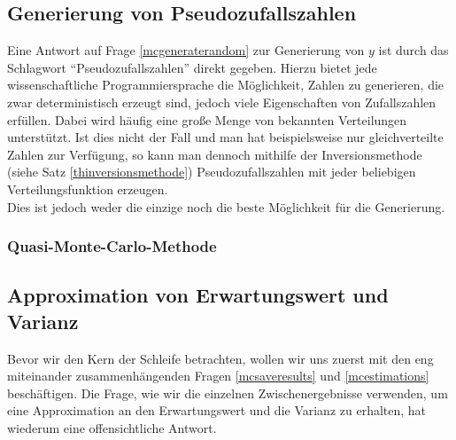 \subsection{Generierung von Pseudozufallszahlen}
Eine Antwort auf Frage \ref{mcgeneraterandom} zur Generierung von $y$ ist durch das Schlagwort "`Pseudozufallszahlen"' direkt gegeben. Hierzu bietet jede wissenschaftliche Programmiersprache die Möglichkeit, Zahlen zu generieren, die zwar deterministisch erzeugt sind, jedoch viele Eigenschaften von Zufallszahlen erfüllen. Dabei wird häufig eine große Menge von bekannten Verteilungen unterstützt. Ist dies nicht der Fall und man hat beispielsweise nur gleichverteilte Zahlen zur Verfügung, so kann man dennoch mithilfe der Inversionsmethode (siehe Satz \ref{thinversionsmethode}) Pseudozufallszahlen mit jeder beliebigen Verteilungsfunktion erzeugen.\\
Dies ist jedoch weder die einzige noch die beste Möglichkeit für die Generierung.
\subsubsection*{Quasi-Monte-Carlo-Methode}%

\subsection{Approximation von Erwartungswert und Varianz}
Bevor wir den Kern der Schleife betrachten, wollen wir uns zuerst mit den eng miteinander zusammenhängenden Fragen \ref{mcsaveresults} und \ref{mcestimations} beschäftigen. Die Frage, wie wir die einzelnen Zwischenergebnisse verwenden, um eine Approximation an den Erwartungswert und die Varianz zu erhalten, hat wiederum eine offensichtliche Antwort.
